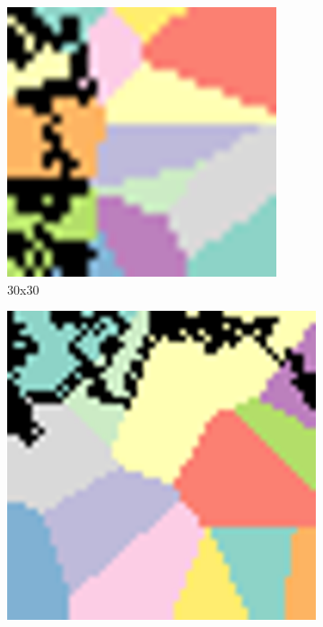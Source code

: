 \documentclass{article}
\begin{document}
\begin{figure}[H]
       \centering
       \begin{subfigure}[b]{0.45\linewidth}
           \includegraphics[width=\linewidth]{14treintaveinte_14.png}
           \caption{30x30}
           \label{fig:westminster_lateral}
        \end{subfigure}
        \begin{subfigure}[b]{0.45\linewidth}
            \includegraphics[width=\linewidth]{14cincuentaveinte_14.png}

\end{subfigure}
\end{figure}
\end{document}
